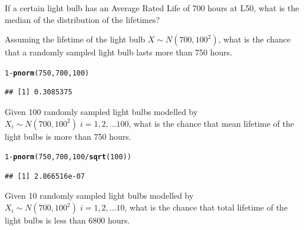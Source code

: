 \documentclass[bigtut]{tutorial}\usepackage[]{graphicx}\usepackage[]{color}
\makeatletter
\newcommand{\hlnum}[1]{\textcolor[rgb]{0.686,0.059,0.569}{#1}}%
\newcommand{\hlopt}[1]{\textcolor[rgb]{0,0,0}{#1}}%
\newcommand{\hlstd}[1]{\textcolor[rgb]{0.345,0.345,0.345}{#1}}%
\newcommand{\hlkwd}[1]{\textcolor[rgb]{0.737,0.353,0.396}{\textbf{#1}}}%
\newenvironment{kframe}{%
 \def\at@end@of@kframe{}%
 \ifinner\ifhmode%
  \def\at@end@of@kframe{\end{minipage}}%
  \begin{minipage}{\columnwidth}%
 \fi\fi%
 \def\FrameCommand##1{\hskip\@totalleftmargin \hskip-\fboxsep
 \colorbox{shadecolor}{##1}\hskip-\fboxsep
     \hskip-\linewidth \hskip-\@totalleftmargin \hskip\columnwidth}%
 \MakeFramed {\advance\hsize-\width
   \@totalleftmargin\z@ \linewidth\hsize
   \@setminipage}}%
 {\par\unskip\endMakeFramed%
 \at@end@of@kframe}
\newenvironment{knitrout}{}{} %
\makeatother
\begin{document}
\begin{tutorial}
\begin{questions}
\vspace{.5cm}
\begin{parts}
\item If a certain light bulb has an Average Rated Life of 700 hours at L50, what is the median of the distribution of the lifetimes?

\vspace{.5cm}
\item 
Assuming the lifetime of the light bulb $X \sim N(700,100^2)$, what is the chance that a randomly sampled light bulb lasts more than 750 hours.

\begin{knitrout}
\color{fgcolor}\begin{kframe}
\begin{alltt}
\hlnum{1}\hlopt{-}\hlkwd{pnorm}\hlstd{(}\hlnum{750}\hlstd{,}\hlnum{700}\hlstd{,}\hlnum{100}\hlstd{)}
\end{alltt}
\begin{verbatim}
## [1] 0.3085375
\end{verbatim}
\end{kframe}
\end{knitrout}

\vspace{.5cm}
\item 
Given 100 randomly sampled light bulbs modelled by $X_i \sim N(700,100^2)\; i=1,2,\ldots 100$, what is the chance that mean lifetime of the light bulbs is more than 750 hours.

\begin{knitrout}
\color{fgcolor}\begin{kframe}
\begin{alltt}
\hlnum{1}\hlopt{-}\hlkwd{pnorm}\hlstd{(}\hlnum{750}\hlstd{,}\hlnum{700}\hlstd{,}\hlnum{100}\hlopt{/}\hlkwd{sqrt}\hlstd{(}\hlnum{100}\hlstd{))}
\end{alltt}
\begin{verbatim}
## [1] 2.866516e-07
\end{verbatim}
\end{kframe}
\end{knitrout}

\vspace{.5cm}
\item 
Given 10 randomly sampled light bulbs modelled by $X_i \sim N(700,100^2)\; i=1,2,\ldots 10$, what is the chance that total lifetime of the light bulbs is less than 6800 hours.


\end{parts}
\end{questions}
\end{tutorial}
\end{document}
